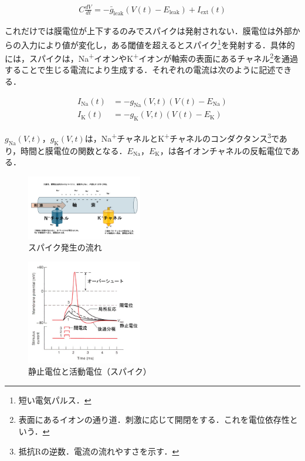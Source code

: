\documentclass[dvipdfmx, A4j, twocolumn, 10.5pt]{jsarticle}
\begin{document}
\begin{align*}
C \frac{dV}{dt} = -\bar{g}_{\text{leak}} \left( V(t) - E_{\text{leak}} \right) + I_{\text{ext}}(t)
\end{align*}

これだけでは膜電位が上下するのみでスパイクは発射されない．膜電位は外部からの入力により値が変化し，ある閾値を超えるとスパイク\footnote{短い電気パルス．}を発射する．具体的には，スパイクは，Na\textsuperscript{+}イオンやK\textsuperscript{+}イオンが軸索の表面にあるチャネル\footnote{表面にあるイオンの通り道．刺激に応じて開閉をする．これを電位依存性という．}を通過することで生じる電流により生成する．それぞれの電流は次のように記述できる．

\begin{align*}
I_{\text{Na}}(t) &= -g_{\text{Na}}(V,t)(V(t) - E_{\text{Na}}) \\
I_{\text{K}}(t) &= -g_{\text{K}}(V,t)(V(t) - E_{\text{K}})
\end{align*}

$g_{\text{Na}}(V,t)$，$g_{\text{K}}(V,t)$は，Na\textsuperscript{+}チャネルとK\textsuperscript{+}チャネルのコンダクタンス\footnote{抵抗Rの逆数．電流の流れやすさを示す．}であり，時間と膜電位の関数となる．$E_{\text{Na}}$，$E_{\text{K}}$，は各イオンチャネルの反転電位である．

\begin{figure}[h]
 \centering
 \includegraphics[width=0.45\textwidth]{spike.png}
 \caption{スパイク発生の流れ} 
\end{figure}


\begin{figure}[h]
 \centering
 \includegraphics[width=0.45\textwidth]{actpot.jpg}
 \caption{静止電位と活動電位（スパイク） \cite{lite1}} 
\end{figure}
\end{document}
